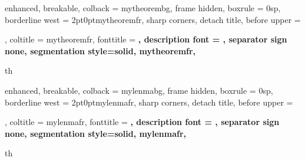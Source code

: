 {%
	enhanced,
	breakable,
	colback = mytheorembg,
	frame hidden,
	boxrule = 0sp,
	borderline west = {2pt}{0pt}{mytheoremfr},
	sharp corners,
	detach title,
	before upper = \tcbtitle\par\smallskip,
	coltitle = mytheoremfr,
	fonttitle = \bfseries\sffamily,
	description font = \mdseries,
	separator sign none,
	segmentation style={solid, mytheoremfr},
}
{th}


{%
	enhanced,
	breakable,
	colback = mylenmabg,
	frame hidden,
	boxrule = 0sp,
	borderline west = {2pt}{0pt}{mylenmafr},
	sharp corners,
	detach title,
	before upper = \tcbtitle\par\smallskip,
	coltitle = mylenmafr,
	fonttitle = \bfseries\sffamily,
	description font = \mdseries,
	separator sign none,
	segmentation style={solid, mylenmafr},
}
{th}


\newcommand{\thm}[2]{\begin{Theorem*}{#1}{}#2\end{Theorem*}}
\newcommand{\qs}[2]{\begin{question*}{#1}{}#2\end{question*}}
\newcommand{\prp}[2]{\begin{Property*}{#1}{}#2\end{Property*}}
\newcommand{\lemma}[2]{\begin{Lemma*}{#1}{}#2\end{Lemma*}}



\hfuzz=125pt      %

\usetikzlibrary{arrows.meta, calc, decorations.markings, backgrounds}
\usepackage{tikz-3dplot}
\usepackage{float}
\usepackage{esint}
